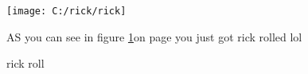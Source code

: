 \documentclass[12pt]{article}
\begin{document}
\begin{figure}[h]
	\centering
	\texttt{[image: C:/rick/rick]}
	\caption{rick roll}
	\label{fig:rick}
	
AS you can see in figure \ref{fig:rick}on page \pageref{fig:rick} you just got rick rolled lol

\end{figure}
\end{document}
